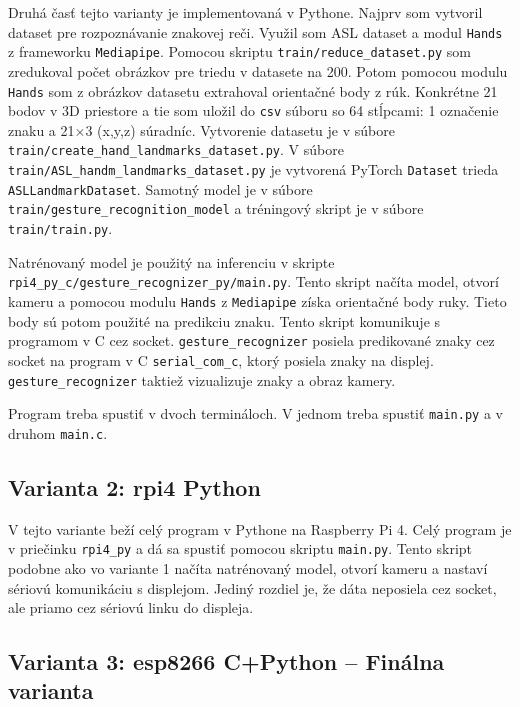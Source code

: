 \documentclass[a4paper, 12pt]{article}
\begin{document}
Druhá časť tejto varianty je implementovaná v Pythone. Najprv som vytvoril dataset pre rozpoznávanie znakovej reči. Využil som ASL dataset a modul \texttt{Hands} z frameworku \texttt{Mediapipe}. Pomocou skriptu \texttt{train/reduce\_dataset.py} som zredukoval počet obrázkov pre triedu v datasete na 200. Potom pomocou modulu \texttt{Hands} som z obrázkov datasetu extrahoval orientačné body z rúk. Konkrétne 21 bodov v 3D priestore a tie som uložil do \texttt{csv} súboru so 64 stĺpcami: 1 označenie znaku a 21\(\times\)3 (x,y,z) súradníc. Vytvorenie datasetu je v súbore \texttt{train/create\_hand\_landmarks\_dataset.py}. V súbore \texttt{train/ASL\_handm\_landmarks\_dataset.py} je vytvorená PyTorch \texttt{Dataset} trieda \texttt{ASLLandmarkDataset}. Samotný model je v súbore \texttt{train/gesture\_recognition\_model} a tréningový skript je v súbore \texttt{train/train.py}.

Natrénovaný model je použitý na inferenciu v skripte \texttt{rpi4\_py\_c/gesture\_recognizer\_py/main.py}. Tento skript načíta model, otvorí kameru a pomocou modulu \texttt{Hands} z \texttt{Mediapipe} získa orientačné body ruky. Tieto body sú potom použité na predikciu znaku. Tento skript komunikuje s programom v C cez socket. \texttt{gesture\_recognizer} posiela predikované znaky cez socket na program v C \texttt{serial\_com\_c}, ktorý posiela znaky na displej. \texttt{gesture\_recognizer} taktiež vizualizuje znaky a obraz kamery.

Program treba spustiť v dvoch termináloch. V jednom treba spustiť \texttt{main.py} a v druhom \texttt{main.c}.

\subsection{Varianta 2: rpi4 Python}

V tejto variante beží celý program v Pythone na Raspberry Pi 4. Celý program je v priečinku \texttt{rpi4\_py} a dá sa spustiť pomocou skriptu \texttt{main.py}. Tento skript podobne ako vo variante 1 načíta natrénovaný model, otvorí kameru a nastaví sériovú komunikáciu s displejom. Jediný rozdiel je, že dáta neposiela cez socket, ale priamo cez sériovú linku do displeja.

\subsection{Varianta 3: esp8266 C+Python – Finálna varianta}
\end{document}
